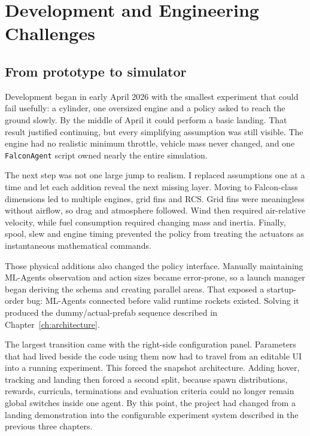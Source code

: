 \chapter{Development and Engineering Challenges}
\label{ch:development}

\section{From prototype to simulator}

Development began in early April 2026 with the smallest experiment that could fail usefully: a
cylinder, one oversized engine and a policy asked to reach the ground slowly. By the middle of
April it could perform a basic landing. That result justified continuing, but every simplifying
assumption was still visible. The engine had no realistic minimum throttle, vehicle mass never
changed, and one \texttt{FalconAgent} script owned nearly the entire simulation.

The next step was not one large jump to realism. I replaced assumptions one at a time and let
each addition reveal the next missing layer. Moving to Falcon-class dimensions led to multiple
engines, grid fins and RCS. Grid fins were meaningless without airflow, so drag and atmosphere
followed. Wind then required air-relative velocity, while fuel consumption required changing
mass and inertia. Finally, spool, slew and engine timing prevented the policy from treating the
actuators as instantaneous mathematical commands.

Those physical additions also changed the policy interface. Manually maintaining ML-Agents
observation and action sizes became error-prone, so a launch manager began deriving the schema
and creating parallel areas. That exposed a startup-order bug: ML-Agents connected before valid
runtime rockets existed. Solving it produced the dummy/actual-prefab sequence described in
Chapter~\ref{ch:architecture}.

The largest transition came with the right-side configuration panel. Parameters that had lived
beside the code using them now had to travel from an editable UI into a running experiment. This
forced the snapshot architecture. Adding hover, tracking and landing then forced a second split,
because spawn distributions, rewards, curricula, terminations and evaluation criteria could no
longer remain global switches inside one agent. By this point, the project had changed from a
landing demonstration into the configurable experiment system described in the previous three
chapters.

